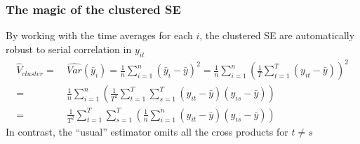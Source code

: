 \documentclass[a4paper,twoside,11pt]{article}
\begin{document}
\subsubsection{The magic of the clustered SE}
By working with the time averages for each $i$, the clustered SE are automatically robust to serial correlation in $y_{it}$
\begin{equation*}
\begin{aligned}
\hat{V}_{cluster} =& \  \widehat{Var}(\bar y_i) = \frac{1}{n} \sum^n_{i=1} (\bar y_i - \bar y)^2  = \frac{1}{n} \sum^n_{i=1}(\frac{1}{T} \sum^T_{t=1} (y_{it} - \bar y))^2 \\
=& \ \frac{1}{n} \sum^n_{i=1} (\frac{1}{T^2} \sum^T_{t=1} \sum^T_{s=1} (y_{it} - \bar y)(y_{is} - \bar y)) \\
= & \ \frac{1}{T^2} \sum^T_{t=1} \sum^T_{s=1} (\frac{1}{n} \sum^n_{i=1} (y_{it} - \bar y)(y_{is} - \bar y))
\end{aligned} 
\end{equation*}
In contrast, the “usual” estimator omits all the cross products for $t \ne s$ 
\end{document}
